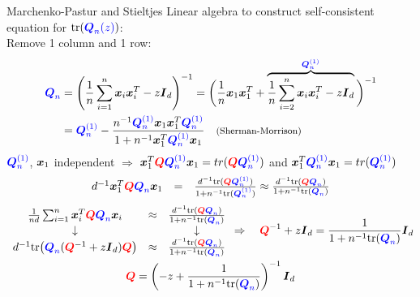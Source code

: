 \documentclass[10pt]{beamer}
\begin{document}
\begin{frame}{Marchenko-Pastur and Stieltjes}
Linear algebra to construct \textcolor{mLightGreen}{self-consistent equation} for $\text{tr}(\textcolor{blue}{\QQ_n(z)})$:\\
{\small Remove 1 column and 1 row:}\\
\vspace{-1cm}
\begin{align*}
    \bQQ &= \left ( \frac{1}{n} \sum_{i=1}^n \xx_i \xx_i^T - z \Id_d \right )^{-1} = \bigg (\frac{1}{n} \xx_1 \xx_1^T + \overbrace{\frac{1}{n} \sum_{i=2}^n \xx_i \xx_i^T- z\Id_d }^{\textcolor{blue}{\QQ^{(1)}_n}} \bigg )^{-1}\\
    &= \bbQQ - \frac{n^{-1} \bbQQ \xx_1 \xx_1^T \bbQQ}{1 + n^{-1} \xx_1^T \bbQQ \xx_1} \quad \text{\footnotesize (Sherman-Morrison)}
\end{align*}
\pause
$\bbQQ$, $\xx_1$ independent $\Rightarrow$ $\xx_1^T \rQQ \bbQQ \xx_1 = tr( \rQQ \bbQQ)$ and $\xx_1^T \bbQQ \xx_1 = tr(\bbQQ)$
\begin{align*}
    \begin{array}{ccc}
    d^{-1} \xx_1^T\rQQ \bQQ \xx_1 & = & \frac{d^{-1} \text{tr}(\rQQ \bbQQ)}{1 + n^{-1}\text{tr}(\bbQQ)} \approx \frac{d^{-1} \text{tr}(\rQQ \bQQ)}{1 + n^{-1}\text{tr}(\bQQ)}\\
    \end{array}
    \end{align*}
    \pause
    \begin{equation*} \begin{gathered}
    \begin{array}{ccc}
        \frac{1}{nd} \sum_{i=1}^n \xx_i^T \rQQ \bQQ \xx_i  &\approx& \frac{d^{-1} \text{tr}(\rQQ \bQQ)}{1 + n^{-1}\text{tr}(\bQQ)}\\
        \downarrow & & \downarrow\\
        d^{-1} \text{tr}\big ( \textcolor{blue}{\QQ_n} ( \textcolor{red}{\QQ}^{-1} + z \Id_d) \textcolor{red}{\QQ} \big ) & \approx & \frac{ d^{-1} \text{tr}(\rQQ \bQQ)}{1 + n^{-1}\text{tr}(\bQQ)}
        \end{array}
        \Rightarrow \quad \rQQ^{-1} + z\Id_d = \frac{1}{1 + n^{-1} \text{tr}(\bQQ)} \Id_d\\
        \rQQ = \left (-z + \frac{1}{1 + n^{-1} \text{tr}(\bQQ)} \right )^{-1} \Id_d
\end{gathered} \end{equation*} 
\end{frame}
\end{document}
